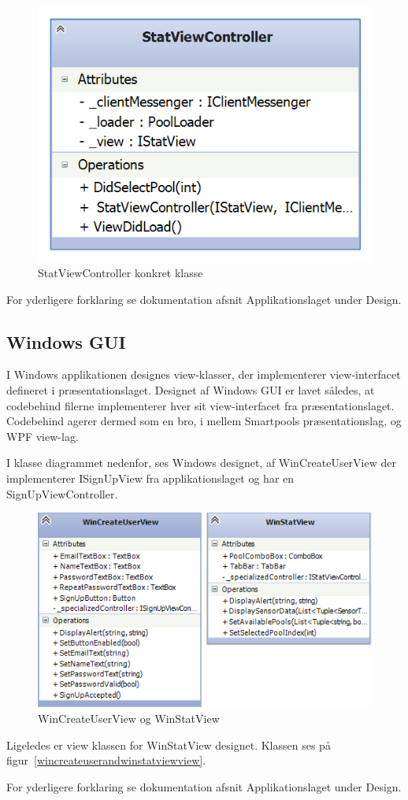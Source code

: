 \begin{figure}
\centering
\includegraphics[width=0.35\linewidth]{figs/design/application_statviewcontroller}
\caption{StatViewController konkret klasse}
\label{fig:application_statviewcontroller}
\end{figure}

For yderligere forklaring se dokumentation afsnit Applikationslaget under Design.

\subsection{Windows GUI}
I Windows applikationen designes view-klasser, der implementerer view-interfacet defineret i præsentationslaget.
Designet af Windows GUI er lavet således, at codebehind filerne implementerer hver sit view-interfacet fra præsentationslaget. Codebehind agerer dermed som en bro, i mellem Smartpools præsentationslag, og WPF view-lag.

I klasse diagrammet nedenfor, ses Windows designet, af WinCreateUserView der implementerer ISignUpView fra applikationslaget og har en SignUpViewController.
\begin{figure}
\centering
\includegraphics[width=0.7\linewidth]{figs/design/wincreateuserandwinstatviewview}
\caption{WinCreateUserView og WinStatView}
\label{fig:wincreateuserandwinstatviewview}
\end{figure}

Ligeledes er view klassen for WinStatView designet.
Klassen ses på figur~\ref{wincreateuserandwinstatviewview}.

For yderligere forklaring se dokumentation afsnit Applikationslaget under Design.

